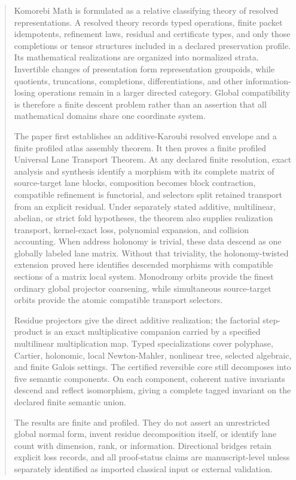 \documentclass[11pt]{article}
\theoremstyle{definition}
\theoremstyle{remark}
\begin{document}
\thispagestyle{plain}
\begin{abstract}
Komorebi Math is formulated as a relative classifying theory of resolved representations. A resolved theory records typed operations, finite packet idempotents, refinement laws, residual and certificate types, and only those completions or tensor structures included in a declared preservation profile. Its mathematical realizations are organized into normalized strata. Invertible changes of presentation form representation groupoids, while quotients, truncations, completions, differentiations, and other information-losing operations remain in a larger directed category. Global compatibility is therefore a finite descent problem rather than an assertion that all mathematical domains share one coordinate system.

The paper first establishes an additive-Karoubi resolved envelope and a finite profiled atlas assembly theorem. It then proves a finite profiled Universal Lane Transport Theorem. At any declared finite resolution, exact analysis and synthesis identify a morphism with its complete matrix of source-target lane blocks, composition becomes block contraction, compatible refinement is functorial, and selectors split retained transport from an explicit residual. Under separately stated additive, multilinear, abelian, or strict fold hypotheses, the theorem also supplies realization transport, kernel-exact loss, polynomial expansion, and collision accounting. When address holonomy is trivial, these data descend as one globally labeled lane matrix. Without that triviality, the holonomy-twisted extension proved here identifies descended morphisms with compatible sections of a matrix local system. Monodromy orbits provide the finest ordinary global projector coarsening, while simultaneous source-target orbits provide the atomic compatible transport selectors.

Residue projectors give the direct additive realization; the factorial step-product is an exact multiplicative companion carried by a specified multilinear multiplication map. Typed specializations cover polyphase, Cartier, holonomic, local Newton-Mahler, nonlinear tree, selected algebraic, and finite Galois settings. The certified reversible core still decomposes into five semantic components. On each component, coherent native invariants descend and reflect isomorphism, giving a complete tagged invariant on the declared finite semantic union.

The results are finite and profiled. They do not assert an unrestricted global normal form, invent residue decomposition itself, or identify lane count with dimension, rank, or information. Directional bridges retain explicit loss records, and all proof-status claims are manuscript-level unless separately identified as imported classical input or external validation.
\end{abstract}
\end{document}
